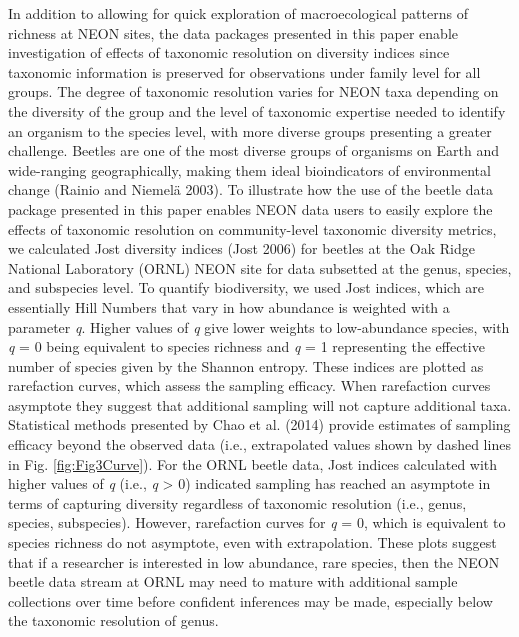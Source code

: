 \documentclass[
  12pt,
]{article}
\begin{document}
In addition to allowing for quick exploration of macroecological patterns of richness at NEON sites, the data packages presented in this paper enable investigation of effects of taxonomic resolution on diversity indices since taxonomic information is preserved for observations under family level for all groups. The degree of taxonomic resolution varies for NEON taxa depending on the diversity of the group and the level of taxonomic expertise needed to identify an organism to the species level, with more diverse groups presenting a greater challenge. Beetles are one of the most diverse groups of organisms on Earth and wide-ranging geographically, making them ideal bioindicators of environmental change (Rainio and Niemelä 2003). To illustrate how the use of the beetle data package presented in this paper enables NEON data users to easily explore the effects of taxonomic resolution on community-level taxonomic diversity metrics, we calculated Jost diversity indices (Jost 2006) for beetles at the Oak Ridge National Laboratory (ORNL) NEON site for data subsetted at the genus, species, and subspecies level. To quantify biodiversity, we used Jost indices, which are essentially Hill Numbers that vary in how abundance is weighted with a parameter \emph{q}. Higher values of \emph{q} give lower weights to low-abundance species, with \emph{q} = 0 being equivalent to species richness and \emph{q} = 1 representing the effective number of species given by the Shannon entropy. These indices are plotted as rarefaction curves, which assess the sampling efficacy. When rarefaction curves asymptote they suggest that additional sampling will not capture additional taxa. Statistical methods presented by Chao et al. (2014) provide estimates of sampling efficacy beyond the observed data (i.e., extrapolated values shown by dashed lines in Fig. \ref{fig:Fig3Curve}). For the ORNL beetle data, Jost indices calculated with higher values of \emph{q} (i.e., \emph{q} \textgreater{} 0) indicated sampling has reached an asymptote in terms of capturing diversity regardless of taxonomic resolution (i.e., genus, species, subspecies). However, rarefaction curves for \emph{q} = 0, which is equivalent to species richness do not asymptote, even with extrapolation. These plots suggest that if a researcher is interested in low abundance, rare species, then the NEON beetle data stream at ORNL may need to mature with additional sample collections over time before confident inferences may be made, especially below the taxonomic resolution of genus.
\end{document}
